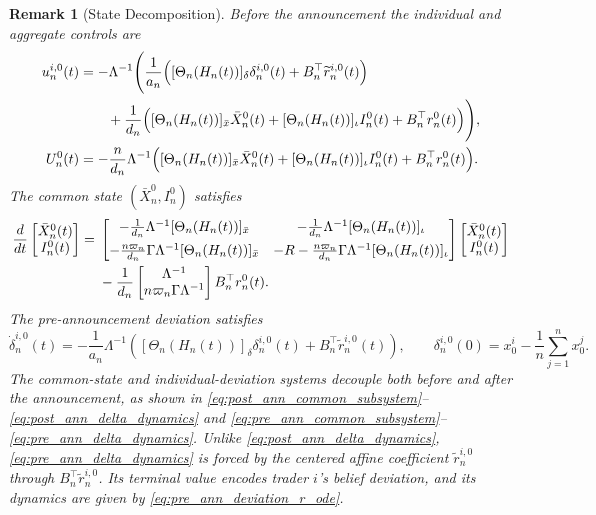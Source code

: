 \documentclass[12pt]{article}
\numberwithin{equation}{section}
\newtheorem{remark}[theorem]{Remark}
\theoremstyle{definition}
\begin{document}
\begin{remark}[State Decomposition]
Before the announcement the individual and aggregate
controls are
\begin{align*}
u_n^{i,0}(t)
&=
-\Lambda^{-1}
\Biggl(
\frac1{a_n}
\Bigl(
[\Theta_n(H_n(t))]_{\delta}\delta_n^{i,0}(t)
+B_n^\top\widetilde r_n^{i,0}(t)
\Bigr)
\\
&\qquad
+\frac1{d_n}
\Bigl(
[\Theta_n(H_n(t))]_{\bar x}\bar X_n^0(t)
+[\Theta_n(H_n(t))]_{\iota}I_n^0(t)
+B_n^\top r_n^0(t)
\Bigr)
\Biggr),\\
U_n^{0}(t)
&=
-\frac{n}{d_n}\Lambda^{-1}
\Bigl(
[\Theta_n(H_n(t))]_{\bar x}\bar X_n^0(t)
+[\Theta_n(H_n(t))]_{\iota}I_n^0(t)
+B_n^\top r_n^0(t)
\Bigr).
\end{align*}
The common state \((\bar X_n^0,I_n^0)\)
satisfies
\begin{align}
\frac{d}{dt}
\begin{bmatrix}
\bar X_n^0(t)\\
I_n^0(t)
\end{bmatrix}
={}&
\begin{bmatrix}
-\frac1{d_n}\Lambda^{-1}[\Theta_n(H_n(t))]_{\bar x}
&
-\frac1{d_n}\Lambda^{-1}[\Theta_n(H_n(t))]_{\iota}
\\[5pt]
-\frac{n\varpi_n}{d_n}\Gamma\Lambda^{-1}[\Theta_n(H_n(t))]_{\bar x}
&
-R-\frac{n\varpi_n}{d_n}\Gamma\Lambda^{-1}[\Theta_n(H_n(t))]_{\iota}
\end{bmatrix}
\begin{bmatrix}
\bar X_n^0(t)\\
I_n^0(t)
\end{bmatrix}
\notag\\
&-
\frac1{d_n}
\begin{bmatrix}
\Lambda^{-1}\\
n\varpi_n\Gamma\Lambda^{-1}
\end{bmatrix}
B_n^\top r_n^0(t).
\label{eq:pre_ann_common_subsystem}
\end{align}
The pre-announcement deviation satisfies
\begin{equation}\label{eq:pre_ann_delta_dynamics}
\dot\delta_n^{i,0}(t)
=
-\frac1{a_n}\Lambda^{-1}
\left(
[\Theta_n(H_n(t))]_{\delta}\delta_n^{i,0}(t)
+B_n^\top\widetilde r_n^{i,0}(t)
\right),
\qquad
\delta_n^{i,0}(0)
=
x_0^i-\frac1n\sum_{j=1}^n x_0^j.
\end{equation}
The common-state and individual-deviation systems decouple both before and
after the announcement, as shown in
\eqref{eq:post_ann_common_subsystem}--\eqref{eq:post_ann_delta_dynamics} and
\eqref{eq:pre_ann_common_subsystem}--\eqref{eq:pre_ann_delta_dynamics}.
Unlike \eqref{eq:post_ann_delta_dynamics},
\eqref{eq:pre_ann_delta_dynamics} is forced by the centered affine coefficient
\(\widetilde r_n^{i,0}\) through 
\(B_n^\top\widetilde r_n^{i,0}\). Its terminal value encodes trader \(i\)'s
belief deviation, and its dynamics are given by
\eqref{eq:pre_ann_deviation_r_ode}.
\end{remark}
\end{document}
